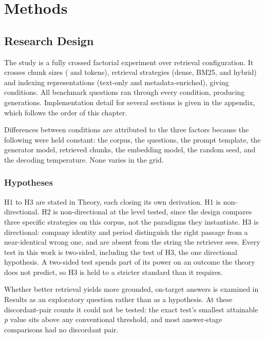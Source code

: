 \chapter{Methods}

\section{Research Design}

The study is a fully crossed factorial experiment over retrieval configuration.
It crosses \thesisNumChunkSizes{} chunk sizes (\thesisChunkSizeSmall{} and
\thesisChunkSizeLarge{} tokens), \thesisNumStrategies{} retrieval strategies
(dense, BM25, and hybrid) and \thesisNumRepresentations{} indexing
representations (text-only and metadata-enriched), giving \thesisNumConditions{}
conditions. All \thesisNumQuestions{} benchmark questions ran through every
condition, producing \thesisNumGenerations{} generations. Implementation detail
for several sections is given in the appendix, which follows the order of this
chapter.

Differences between conditions are attributed to the three factors because the
following were held constant: the corpus, the questions, the prompt template,
the generator model, \thesisTopK{} retrieved chunks, the embedding model, the
random seed, and the decoding temperature. None varies in the grid.

\subsection{Hypotheses}

H1 to H3 are stated in Theory, each closing its own derivation. H1 is
non-directional. H2 is non-directional at the level tested, since the
design compares three specific strategies on this corpus, not the paradigms they
instantiate.
H3 is directional: company identity and period distinguish the right passage
from a near-identical wrong one, and are absent from the string the retriever
sees. Every test in this work is two-sided, including the test of H3, the one
directional hypothesis. A two-sided test spends part of its power on an outcome
the theory does not predict, so H3 is held to a stricter standard than it
requires.

Whether better retrieval yields more grounded, on-target answers is examined in
Results as an exploratory question rather than as a hypothesis. At these
discordant-pair counts it could not be tested: the exact test's smallest
attainable \emph{p} value sits above any conventional threshold, and most
answer-stage comparisons had no discordant pair.

